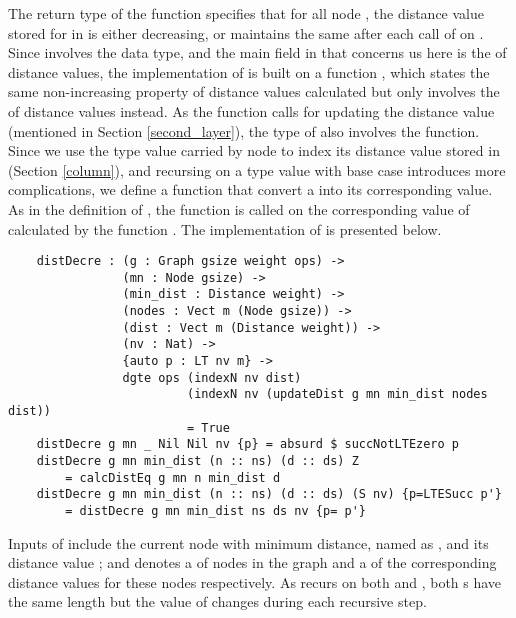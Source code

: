 The return type of the  function specifies that for all node , the distance value stored for  in  is either decreasing, or maintains the same after each call of  on . Since  involves the  data type, and the main field in  that concerns us here is the  of distance values, the implementation of  is built on a function , which states the same non-increasing property of distance values calculated but only involves the  of distance values instead. 
As the function  calls  for updating the distance value  (mentioned in Section \ref{second_layer}), the type of  also involves the  function. Since we use the  type value carried by node  to index its distance value stored in  (Section \ref{column}), and recursing on a  type value with base case  introduces more complications, we define a  function that convert a  into its corresponding  value. As in the definition of , the  function is called on the corresponding  value of  calculated by the function . The implementation of  is presented below.
\begin{lstlisting}
	distDecre : (g : Graph gsize weight ops) ->
	            (mn : Node gsize) ->
	            (min_dist : Distance weight) ->
	            (nodes : Vect m (Node gsize)) ->
	            (dist : Vect m (Distance weight)) ->
	            (nv : Nat) ->
	            {auto p : LT nv m} ->
	            dgte ops (indexN nv dist) 
	            		 (indexN nv (updateDist g mn min_dist nodes dist)) 
	            		 = True
	distDecre g mn _ Nil Nil nv {p} = absurd $ succNotLTEzero p
	distDecre g mn min_dist (n :: ns) (d :: ds) Z 
		= calcDistEq g mn n min_dist d
	distDecre g mn min_dist (n :: ns) (d :: ds) (S nv) {p=LTESucc p'} 
		= distDecre g mn min_dist ns ds nv {p= p'}
\end{lstlisting}

Inputs of  include the current node with minimum distance, named as , and its distance value ;  and  denotes a  of nodes in the graph and a  of the corresponding distance values for these nodes respectively. As  recurs on both  and , both s have the same length  but the value of  changes during each recursive step. 
\\


